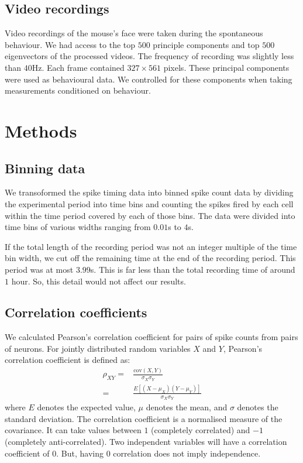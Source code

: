 \documentclass[a4paper,12pt]{article}
\theoremstyle{definition}
\newcommand{\cov}{\text{cov}} %
\begin{document}
    \subsection{Video recordings}\label{sec:video_recordings}
    Video recordings of the mouse's face were taken during the spontaneous behaviour. We had access to the top $500$ principle components and top $500$ eigenvectors of the processed videos. The frequency of recording was slightly less than $40$Hz. Each frame contained $327 \times 561$ pixels. These principal components were used as behavioural data. We controlled for these components when taking measurements conditioned on behaviour.

\section{Methods}
    \subsection{Binning data}
    We transoformed the spike timing data into binned spike count data by dividing the experimental period into time bins and counting the spikes fired by each cell within the time period covered by each of those bins. The data were divided into time bins of various widths ranging from $0.01$s to $4$s.

    If the total length of the recording period was not an integer multiple of the time bin width, we cut off the remaining time at the end of the recording period. This period was at most $3.99$s. This is far less than the total recording time of around $1$ hour. So, this detail would not affect our results.

    \subsection{Correlation coefficients}
    We calculated Pearson's correlation coefficient for pairs of spike counts from pairs of neurons. For jointly distributed random variables $X$ and $Y$, Pearson's correlation coefficient is defined as:
    \begin{align}\label{eq:dist_pearsons_corr}
        \rho_{XY} =& \frac{\cov(X,Y)}{\sigma_X \sigma_Y} \\
                  =& \frac{E[(X - \mu_X)(Y - \mu_Y)]}{\sigma_X \sigma_Y}
    \end{align}
    where $E$ denotes the expected value, $\mu$ denotes the mean, and $\sigma$ denotes the standard deviation. The correlation coefficient is a normalised measure of the covariance. It can take values between $1$ (completely correlated) and $-1$ (completely anti-correlated). Two independent variables will have a correlation coefficient of $0$. But, having $0$ correlation does not imply independence.
\end{document}
